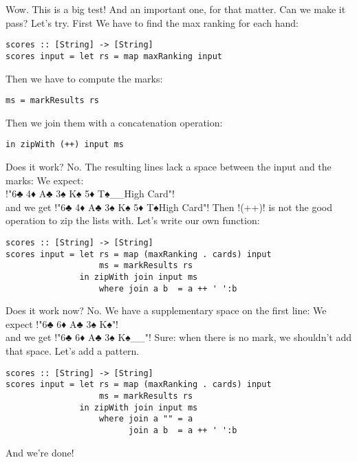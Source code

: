 \lhA Wow. This is a big test!
\lhN And an important one, for that matter. Can we make it pass?
\lhA Let's try. First We have to find the max ranking for each hand:
\begin{lstlisting}[frame=single]
scores :: [String] -> [String]
scores input = let rs = map maxRanking input
\end{lstlisting}
Then we have to compute the marks:
\begin{lstlisting}[frame=single]
                   ms = markResults rs
\end{lstlisting}
Then we join them with a concatenation operation:
\begin{lstlisting}[frame=single]
               in zipWith (++) input ms
\end{lstlisting}
\failure Does it work?
\lhN No. The resulting lines lack a space between the input and the marks:
We expect:\\ \il!"6♣ 4♦ A♣ 3♠ K♠ 5♦ T♠__High Card"! \\ 
and we get \il!"6♣ 4♦ A♣ 3♠ K♠ 5♦ T♠High Card"!
\lhA \failure Then \il!(++)! is not the good operation to zip the lists with. Let's write our own function:
\begin{lstlisting}[frame=single]
scores :: [String] -> [String]
scores input = let rs = map (maxRanking . cards) input
                   ms = markResults rs
               in zipWith join input ms
                   where join a b  = a ++ ' ':b
\end{lstlisting}
\failure Does it work now?
\lhN No. We have a supplementary space on the first line:
We expect \il!"6♣ 6♦ A♣ 3♠ K♠"! \\ and we get \il!"6♣ 6♦ A♣ 3♠ K♠__"!
\lhA \failure Sure: when there is no mark, we shouldn't add that space. Let's add a pattern.
\begin{lstlisting}[frame=single]
scores :: [String] -> [String]
scores input = let rs = map (maxRanking . cards) input
                   ms = markResults rs
               in zipWith join input ms
                   where join a "" = a
                         join a b  = a ++ ' ':b
\end{lstlisting}
\success And we're done!
\lhend
